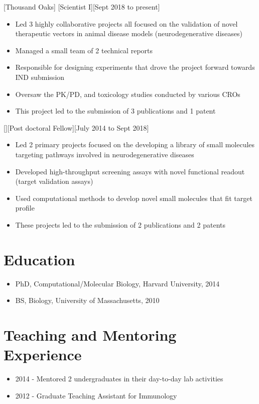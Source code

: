 \documentclass{article}
\begin{document}
[Thousand Oaks]
[Scientist I][Sept 2018 to present]

\begin{itemize}
\item Led 3 highly collaborative projects all focused on the validation of novel therapeutic vectors in animal disease models (neurodegenerative diseases)
\item Managed a small team of 2 technical reports
\item Responsible for designing experiments that drove the project forward towards IND submission
\item Oversaw the PK/PD, and toxicology studies conducted by various CROs
\item This project led to the submission of 3 publications and 1 patent
\end{itemize}

[][Post doctoral Fellow][July 2014 to Sept 2018]

\begin{itemize}
\item Led 2 primary projects focused on the developing a library of small molecules targeting pathways involved in neurodegenerative diseases
\item Developed high-throughput screening assays with novel functional readout (target validation assays)
\item Used computational methods to develop novel small molecules that fit target profile
\item These projects led to the submission of 2 publications and 2 patents
\end{itemize}

 
\section{Education}

\begin{itemize}
\item PhD, Computational/Molecular Biology, Harvard University, 2014  
\item BS, Biology, University of Massachusetts, 2010
\end{itemize}
 
\section{Teaching and Mentoring Experience }
\begin{itemize}
\item 2014 - Mentored 2 undergraduates in their day-to-day lab activities
\item 2012 - Graduate Teaching Assistant for Immunology
\end{itemize}
\end{document}
